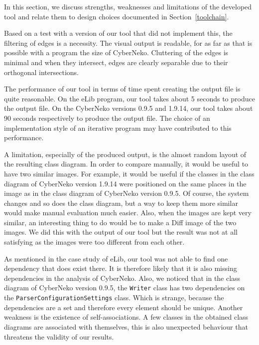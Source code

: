 In this section, we discuss strengths, weaknesses and limitations of the developed tool and relate them to design choices documented in Section~\ref{toolchain}. 

Based on a test with a version of our tool that did not implement this, the filtering of edges is a necessity.
The visual output is readable, for as far as that is possible with a program the size of CyberNeko.
Cluttering of the edges is minimal and when they intersect, edges are clearly separable due to their orthogonal intersections.

The performance of our tool in terms of time spent creating the output file is quite reasonable.
On the eLib program, our tool takes about 5 seconds to produce the output file.
On the CyberNeko versions 0.9.5 and 1.9.14, our tool takes about 90 seconds respectively to produce the output file.
The choice of an implementation style of an iterative program may have contributed to this performance.

A limitation, especially of the produced output, is the almost random layout of the resulting class diagram.
In order to compare manually, it would be useful to have two similar images.
For example, it would be useful if the classes in the class diagram of CyberNeko version 1.9.14 were positioned on the same places in the image as in the class diagram of CyberNeko version 0.9.5. 
Of course, the system changes and so does the class diagram, but a way to keep them more similar would make manual evaluation much easier. 
Also, when the images are kept very similar, an interesting thing to do would be to make a Diff image of the two images.
We did this with the output of our tool but the result was not at all satisfying as the images were too different from each other.

As mentioned in the case study of eLib, our tool was not able to find one dependency that does exist there.
It is therefore likely that it is also missing dependencies in the analysis of CyberNeko.
Also, we noticed that in the class diagram of CyberNeko version 0.9.5, the \texttt{Writer} class has two dependencies on the \texttt{ParserConfigurationSettings} class.
Which is strange, because the dependencies are a set and therefore every element should be unique. 
Another weakness is the existence of self-associations. A few classes in the obtained class diagrams are associated with themselves, this is also unexpected behaviour that threatens the validity of our results.